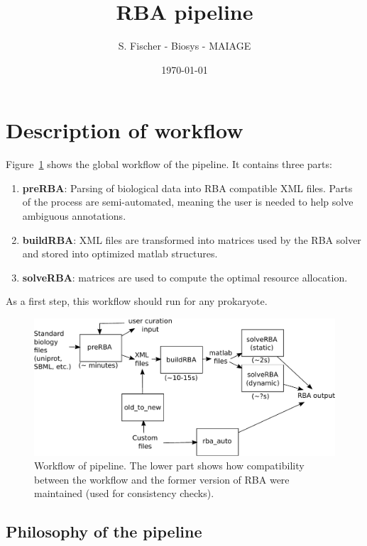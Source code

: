 \documentclass[12pt]{scrartcl}
\newcommand\reft[3][]{#2~\ref{#3}#1}
\theoremstyle{definition}
\theoremstyle{remark}
\numberwithin{equation}{section}
\newcommand\reffigt[2][]{\reft[#1]{Figure}{#2}}
\begin{document}
\title{RBA pipeline}%
\author{S. Fischer - Biosys - MAIAGE}%
\date{\today}%

\maketitle

\newpage

\tableofcontents

\newpage

\section{Description of workflow}

\reffigt{fig:workflow} shows the global workflow of the pipeline. It contains three parts:
\begin{enumerate}
\item \textbf{preRBA}: Parsing of biological data into RBA compatible XML files. Parts of the process are semi-automated, meaning the user is needed to help solve ambiguous annotations.
\item \textbf{buildRBA}: XML files are transformed into matrices used by the RBA solver and stored into optimized matlab structures.
\item \textbf{solveRBA}: matrices are used to compute the optimal resource allocation.
\end{enumerate}
As a first step, this workflow should run for any prokaryote.

\begin{figure}[ht]
  \centering
  \includegraphics[width=\linewidth]{workflow}
  \caption{Workflow of pipeline. The lower part shows how compatibility between the workflow and the former version of RBA were maintained (used for consistency checks).}
  \label{fig:workflow}
\end{figure}

\subsection{Philosophy of the pipeline}
\end{document}
